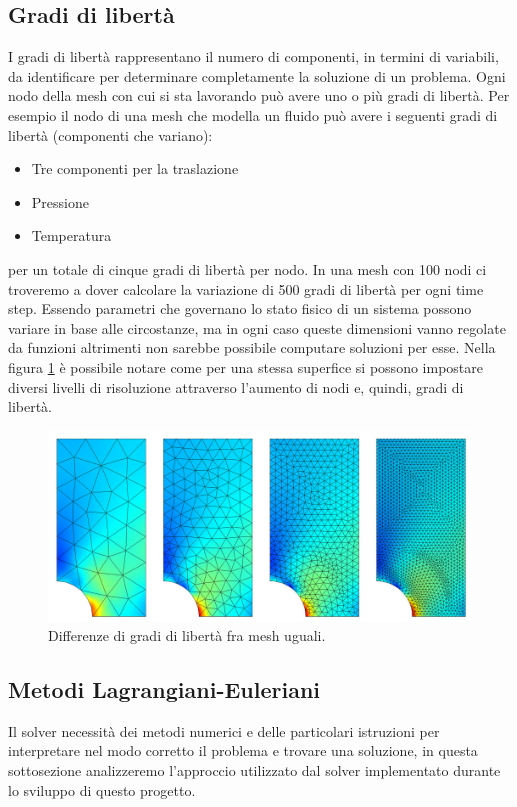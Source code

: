    \subsection{Gradi di libertà}\label{dof}
    I gradi di libertà rappresentano il numero di componenti, in termini di variabili, da identificare per determinare completamente la soluzione di un problema. Ogni nodo della mesh con cui si sta lavorando
    può avere uno o più gradi di libertà. Per esempio il nodo di una mesh che modella un fluido può avere i seguenti gradi di libertà (componenti che variano):
    \begin{itemize}
        \item Tre componenti per la traslazione
        \item Pressione
        \item Temperatura
    \end{itemize}
    per un totale di cinque gradi di libertà per nodo. In una mesh con 100 nodi ci troveremo a dover calcolare la variazione di 500 gradi di libertà per ogni time step.
    Essendo parametri che governano lo stato fisico di un sistema possono variare in base alle circostanze, ma in ogni caso queste dimensioni vanno regolate da funzioni altrimenti
    non sarebbe possibile computare soluzioni per esse.
    Nella figura \ref*{fig:meshdof} è possibile notare come per una stessa superfice si possono impostare diversi livelli di risoluzione attraverso l'aumento di nodi e, quindi, gradi di libertà.
    \begin{figure}[H]\label{fig:meshdof}
        \centering
        \includegraphics[width=\linewidth]{figure/meshdof.jpg}
        \caption{Differenze di gradi di libertà fra mesh uguali.}
    \end{figure}
    
    \subsection{Metodi Lagrangiani-Euleriani}\label{lagrangian-eulerian}
    Il solver necessità dei metodi numerici e delle particolari istruzioni per interpretare nel modo corretto il problema e trovare una soluzione, in questa sottosezione analizzeremo
    l'approccio utilizzato dal solver implementato durante lo sviluppo di questo progetto.

